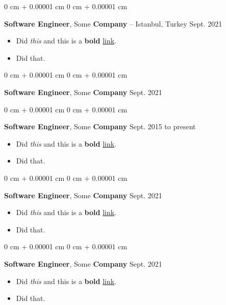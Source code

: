 \documentclass[10pt, letterpaper]{article}
\newenvironment{highlights}{
    \begin{itemize}[
        topsep=0.10 cm,
        parsep=0.10 cm,
        partopsep=0pt,
        itemsep=0pt,
        leftmargin=0 cm + 10pt
    ]
}{
    \end{itemize}
        
    \vspace{-0.20cm}
} %
\newenvironment{onecolentry}{
    \begin{adjustwidth}{
        0 cm + 0.00001 cm
    }{
        0 cm + 0.00001 cm
    }
}{
    \end{adjustwidth}
} %
\begin{document}
        \begin{onecolentry}
            \textbf{Software Engineer}, Some \textbf{Company} -- Istanbul, Turkey \hfill Sept. 2021
            \begin{highlights}
                \item Did \textit{this} and this is a \textbf{bold} \href{https://example.com}{link}.
                \item Did that.
            \end{highlights}
        \end{onecolentry}

        \vspace{0.1 cm}

        \begin{onecolentry}
            \textbf{Software Engineer}, Some \textbf{Company} \hfill Sept. 2021
        \end{onecolentry}

        \vspace{0.1 cm}

        \begin{onecolentry}
            \textbf{Software Engineer}, Some \textbf{Company} \hfill Sept. 2015 to present
            \begin{highlights}
                \item Did \textit{this} and this is a \textbf{bold} \href{https://example.com}{link}.
                \item Did that.
            \end{highlights}
        \end{onecolentry}

        \vspace{0.1 cm}

        \begin{onecolentry}
            \textbf{Software Engineer}, Some \textbf{Company} \hfill Sept. 2021
            \begin{highlights}
                \item Did \textit{this} and this is a \textbf{bold} \href{https://example.com}{link}.
                \item Did that.
            \end{highlights}
        \end{onecolentry}

        \vspace{0.1 cm}

        \begin{onecolentry}
            \textbf{Software Engineer}, Some \textbf{Company} \hfill Sept. 2021
            \begin{highlights}
                \item Did \textit{this} and this is a \textbf{bold} \href{https://example.com}{link}.
                \item Did that.
            \end{highlights}
        \end{onecolentry}
\end{document}
